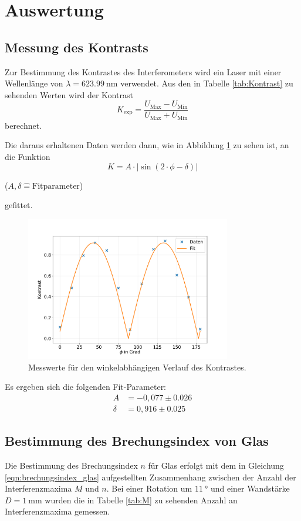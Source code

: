 \section{Auswertung}
\subsection{Messung des Kontrasts}
Zur Bestimmung des Kontrastes des Interferometers wird ein Laser mit einer Wellenlänge von $\lambda = \SI{623,99}{\nano \meter}$ verwendet. Aus den in Tabelle \ref{tab:Kontrast} zu sehenden Werten wird der Kontrast
\begin{equation}
    K_\text{exp} = \frac{U_\text{Max}-U_\text{Min}}{U_\text{Max}+U_\text{Min}}
\end{equation}
berechnet.

Die daraus erhaltenen Daten werden dann, wie in Abbildung \ref{fig:Kontrast} zu sehen ist, an die Funktion
\begin{equation}
    K = A \cdot | \sin{(2 \cdot \phi -\delta)} |
\end{equation}
\begin{center}
    \tiny{($A, \delta \hat{=} \text{Fitparameter} $)}
\end{center}
gefittet.
\begin{figure}[H]
    \centering
    \includegraphics[width=0.8\textwidth]{data/kontrast.pdf}
    \caption{Messwerte für den winkelabhängigen Verlauf des Kontrastes.}
    \label{fig:Kontrast}
\end{figure}
Es ergeben sich die folgenden Fit-Parameter:
\begin{align}
       A &=  -0,077 \pm 0.026 \\
  \delta &=  0,916 \pm 0.025
\end{align}

\subsection{Bestimmung des Brechungsindex von Glas}
Die Bestimmung des Brechungsindex $n$ für Glas erfolgt mit dem in Gleichung \ref{eqn:brechungsindex_glas} aufgestellten Zusammenhang zwischen der Anzahl der Interferenzmaxima $M$ und $n$.
Bei einer Rotation um $\SI{11}{\degree}$ und einer Wandstärke $D = \SI{1}{\milli \meter} $ wurden die in Tabelle \ref{tab:M} zu sehenden Anzahl an Interferenzmaxima gemessen.


